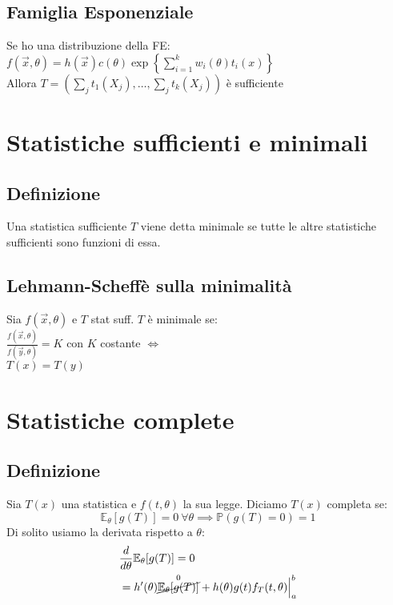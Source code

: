 \documentclass[a4paper,notitlepage]{report}%
\newcommand{\p}{\mathbb{P}} %
\newcommand{\E}{\mathbb{E}} %
\begin{document}
\begin{multicols*}{2}
    \subsection*{Famiglia Esponenziale}
    Se ho una distribuzione della FE:\\
    $f(\vec{x},\theta) = h(\vec{x}) c(\theta) \exp\left\{ \sum_{i=1}^k w_i(\theta) t_i(x) \right\}$ \\
    Allora $T=(\sum_j t_1(X_j), \dots, \sum_j t_k(X_j) )$ è sufficiente


\section*{Statistiche sufficienti e minimali}


    \subsection*{Definizione}
    Una statistica sufficiente $T$ viene detta minimale
    se tutte le altre statistiche sufficienti sono funzioni
    di essa.


    \subsection*{Lehmann-Scheffè sulla minimalità}
    Sia $f(\vec{x},\theta)$ e $T$ stat suff. $T$ è minimale se:\\
    $\frac{f(\vec{x},\theta)}{f(\vec{y},\theta)}=K$ con $K$ costante
    $\iff$ \\
    $T(x)=T(y)$


\section*{Statistiche complete}


    \subsection*{Definizione}
    Sia $T(x)$ una statistica e $f(t,\theta)$ la sua legge.
    Diciamo $T(x)$ completa se:
    \[
        \E_\theta[g(T)] = 0 \: \forall\theta \implies \p(g(T)=0)=1    
    \]
    Di solito usiamo la derivata rispetto a $\theta$:
    \begin{align*}
        & \frac{d}{d\theta} \E_\theta[g(T)] = 0 \\
        & = h'(\theta) \overset{0}{\cancel{\E_\theta[g(T)]}} + h(\theta)g(t)f_T(t,\theta) \Big|_a^b
    \end{align*}


\end{multicols*}
\end{document}
